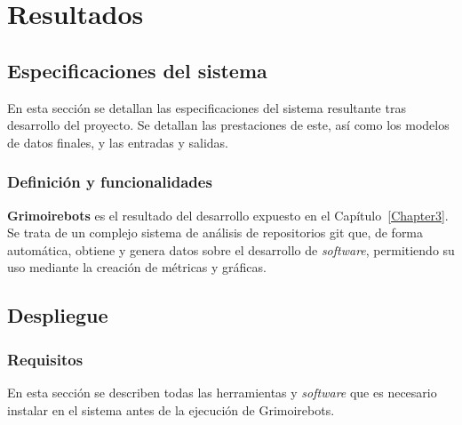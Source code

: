 
\chapter{Resultados} %

\label{Chapter4} %


\section{Especificaciones del sistema}

En esta sección se detallan las especificaciones del sistema resultante tras desarrollo del proyecto. Se detallan las prestaciones de este, así como los modelos de datos finales, y las entradas y salidas.

\subsection{Definición y funcionalidades}

\textbf{Grimoirebots} es el resultado del desarrollo expuesto en el Capítulo~{\ref{Chapter3}}. Se trata de un complejo sistema de análisis de repositorios git que, de forma automática, obtiene y genera datos sobre el desarrollo de \emph{software}, permitiendo su uso mediante la creación de métricas y gráficas.


\section{Despliegue}

\subsection{Requisitos}

En esta sección se describen todas las herramientas y \emph{software} que es necesario instalar en el sistema antes de la ejecución de Grimoirebots.

